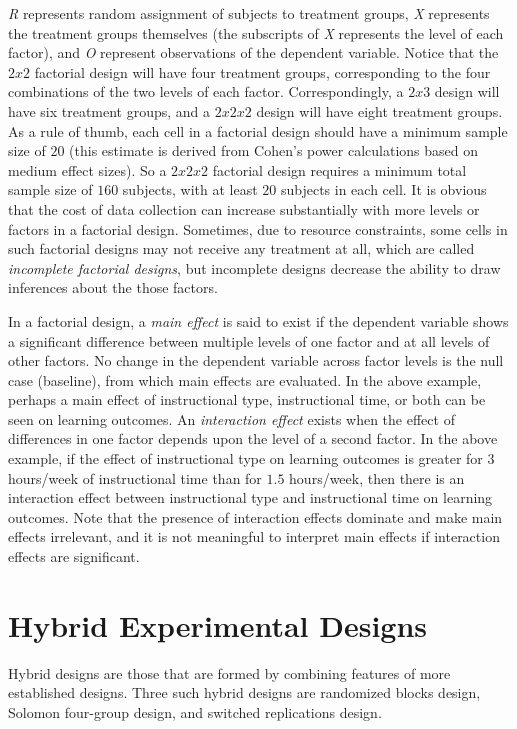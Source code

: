 \textit{R} represents random assignment of subjects to treatment groups, \textit{X} represents the treatment groups themselves (the subscripts of \textit{X} represents the level of each factor), and \textit{O} represent observations of the dependent variable. Notice that the $ 2 x 2 $ factorial design will have four treatment groups, corresponding to the four combinations of the two levels of each factor. Correspondingly, a $ 2 x 3 $ design will have six treatment groups, and a $ 2 x 2 x 2 $ design will have eight treatment groups. As a rule of thumb, each cell in a factorial design should have a minimum sample size of $ 20 $ (this estimate is derived from Cohen's power calculations based on medium effect sizes). So a $ 2 x 2 x 2 $ factorial design requires a minimum total sample size of $ 160 $ subjects, with at least $ 20 $ subjects in each cell. It is obvious that the cost of data collection can increase substantially with more levels or factors in a factorial design. Sometimes, due to resource constraints, some cells in such factorial designs may not receive any treatment at all, which are called \textit{incomplete factorial designs}, but incomplete designs decrease the ability to draw inferences about the those factors.

In a factorial design, a \textit{main effect} is said to exist if the dependent variable shows a significant difference between multiple levels of one factor and at all levels of other factors. No change in the dependent variable across factor levels is the null case (baseline), from which main effects are evaluated. In the above example, perhaps a main effect of instructional type, instructional time, or both can be seen on learning outcomes. An \textit{interaction effect} exists when the effect of differences in one factor depends upon the level of a second factor. In the above example, if the effect of instructional type on learning outcomes is greater for $ 3 $ hours/week of instructional time than for $ 1.5 $ hours/week, then there is an interaction effect between instructional type and instructional time on learning outcomes. Note that the presence of interaction effects dominate and make main effects irrelevant, and it is not meaningful to interpret main effects if interaction effects are significant.

\section{Hybrid Experimental Designs}

Hybrid designs are those that are formed by combining features of more established designs. Three such hybrid designs are randomized blocks design, Solomon four-group design, and switched replications design.

